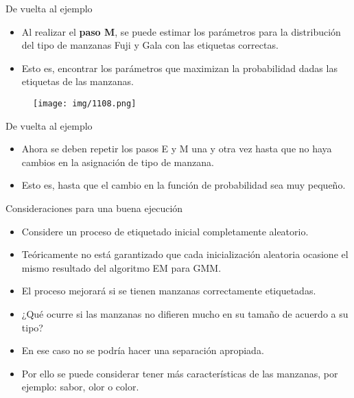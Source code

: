 \documentclass[11pt,aspectratio=169]{beamer}
\begin{document}
\begin{frame}{De vuelta al ejemplo}
\begin{itemize}
	\item Al realizar el \textbf{paso M}, se puede estimar los parámetros para la distribución del tipo de manzanas Fuji y Gala con las 
		etiquetas correctas.\pause
	\item Esto es, encontrar los parámetros que maximizan la probabilidad dadas las etiquetas de las manzanas.\pause
\end{itemize}
\begin{figure}[H]
	\centering
	\texttt{[image: img/1108.png]}
\end{figure}
\end{frame}

\begin{frame}{De vuelta al ejemplo}
\begin{itemize}
	\item Ahora se deben repetir los pasos E y M una y otra vez hasta que no haya cambios en la asignación de tipo de manzana.\pause
	\item Esto es, hasta que el cambio en la función de probabilidad sea muy pequeño.
\end{itemize}
\end{frame}

\begin{frame}{Consideraciones para una buena ejecución}
\begin{itemize}
	\item Considere un proceso de etiquetado inicial completamente aleatorio.\pause
	\item Teóricamente no está garantizado que cada inicialización aleatoria ocasione el mismo resultado del algoritmo EM para GMM.\pause
	\item El proceso mejorará si se tienen manzanas correctamente etiquetadas.\pause
	\item ¿Qué ocurre si las manzanas no difieren mucho en su tamaño de acuerdo a su tipo?\pause
	\item En ese caso no se podría hacer una separación apropiada.\pause
	\item Por ello se puede considerar tener más características de las manzanas, por ejemplo: sabor, olor o color.
\end{itemize}
\end{frame}
\end{document}
